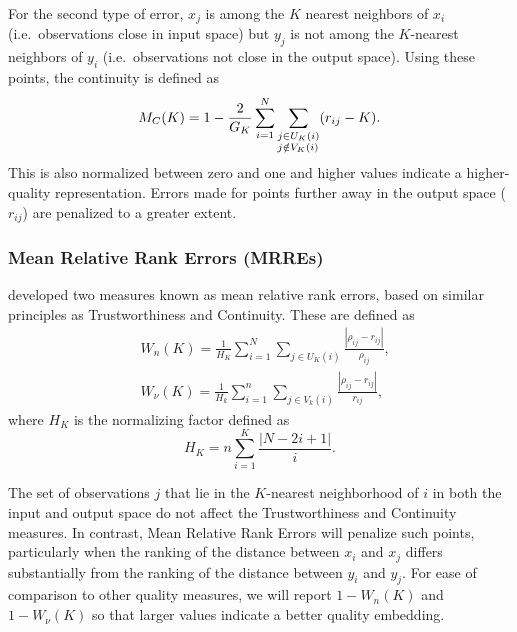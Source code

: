 \documentclass[11pt,a4paper,]{article}
\begin{document}
For the second type of error, \(x_j\) is among the \(K\) nearest neighbors of \(x_i\) (i.e.~observations close in input space) but \(y_j\) is not among the \(K\)-nearest neighbors of \(y_i\) (i.e.~observations not close in the output space). Using these points, the continuity is defined as
\begin{equation}\label{eq:continuity}
  M_{C}(K)=1-\frac{2}{G_{K}} \sum_{i=1}^{N} \sum_{\begin{subarray}{\ell}j \in U_{K}(i) \\j\notin V_{K}(i)\end{subarray}}(r_{ij}-K).
\end{equation}
This is also normalized between zero and one and higher values indicate a higher-quality representation. Errors made for points further away in the output space (\(r_{ij}\)) are penalized to a greater extent.

\hypertarget{mean-relative-rank-errors-mrres}{%
\subsubsection*{Mean Relative Rank Errors (MRREs)}\label{mean-relative-rank-errors-mrres}}

\textcite{Lee2008-cx} developed two measures known as mean relative rank errors, based on similar principles as Trustworthiness and Continuity. These are defined as
\begin{equation}\label{eq:MRREs}
\begin{aligned}
  & W_{n}(K)=\frac{1}{H_{K}} \sum_{i=1}^{N} \sum_{j \in U_{K}(i)} \frac{|\rho_{ij}-r_{ij}|}{\rho_{ij}}, \\
  & W_{\nu}(K)=\frac{1}{H_{k}} \sum_{i=1}^{n} \sum_{j \in V_{k}(i)} \frac{|\rho_{ij}-r_{ij}|}{r_{ij}},
\end{aligned}
\end{equation}
where \(H_K\) is the normalizing factor defined as
\[
  H_{K}=n \sum_{i=1}^{K} \frac{|N-2 i+1|}{i}.
\]

The set of observations \(j\) that lie in the \(K\)-nearest neighborhood of \(i\) in both the input and output space do not affect the Trustworthiness and Continuity measures. In contrast, Mean Relative Rank Errors will penalize such points, particularly when the ranking of the distance between \(x_i\) and \(x_j\) differs substantially from the ranking of the distance between \(y_i\) and \(y_j\). For ease of comparison to other quality measures, we will report \(1-W_{n}(K)\) and \(1-W_{\nu}(K)\) so that larger values indicate a better quality embedding.
\end{document}

